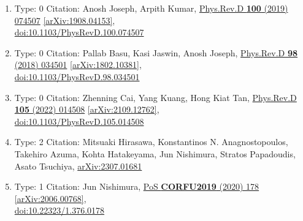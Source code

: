 \documentclass[a4paper,10pt]{article}
\begin{document}
\begin{enumerate}
\begin{enumerate}
  \item Type: 0 Citation: Anosh Joseph, Arpith Kumar, \href{https://www.doi.org/10.1103/PhysRevD.100.074507}{Phys.Rev.D {\bf 100} (2019) 074507}  \href{https://arxiv.org/abs/1908.04153}{[arXiv:1908.04153]},\\\href{https://www.doi.org/10.1103/PhysRevD.100.074507}{doi:10.1103/PhysRevD.100.074507}
  \item Type: 0 Citation: Pallab Basu, Kasi Jaswin, Anosh Joseph, \href{https://www.doi.org/10.1103/PhysRevD.98.034501}{Phys.Rev.D {\bf 98} (2018) 034501}  \href{https://arxiv.org/abs/1802.10381}{[arXiv:1802.10381]},\\\href{https://www.doi.org/10.1103/PhysRevD.98.034501}{doi:10.1103/PhysRevD.98.034501}
  \item Type: 0 Citation: Zhenning Cai, Yang Kuang, Hong Kiat Tan, \href{https://www.doi.org/10.1103/PhysRevD.105.014508}{Phys.Rev.D {\bf 105} (2022) 014508}  \href{https://arxiv.org/abs/2109.12762}{[arXiv:2109.12762]},\\\href{https://www.doi.org/10.1103/PhysRevD.105.014508}{doi:10.1103/PhysRevD.105.014508}
  \item Type: 2 Citation: Mitsuaki Hirasawa, Konstantinos N. Anagnostopoulos, Takehiro Azuma, Kohta Hatakeyama, Jun Nishimura, Stratos Papadoudis, Asato Tsuchiya, \href{https://arxiv.org/abs/2307.01681}{arXiv:2307.01681}
  \item Type: 1 Citation: Jun Nishimura, \href{https://www.doi.org/10.22323/1.376.0178}{PoS {\bf CORFU2019} (2020) 178}  \href{https://arxiv.org/abs/2006.00768}{[arXiv:2006.00768]},\\\href{https://www.doi.org/10.22323/1.376.0178}{doi:10.22323/1.376.0178}

\end{enumerate}
\end{enumerate}
\end{document}

